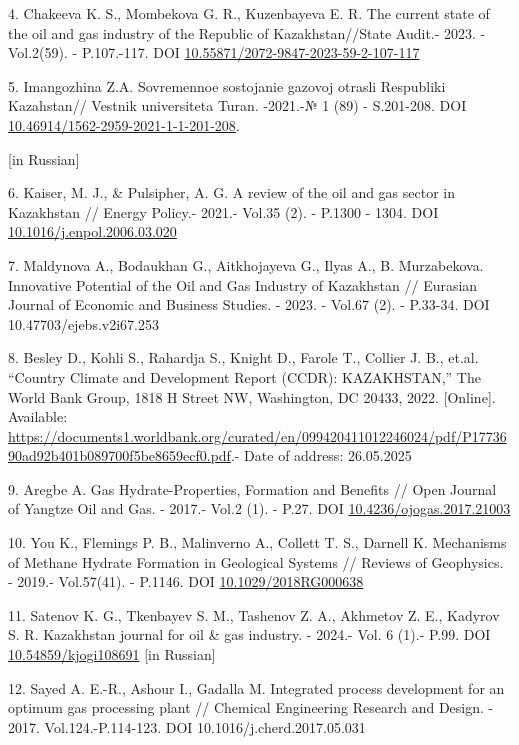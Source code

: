4. Chakeeva K. S., Mombekova G. R., Kuzenbayeva E. R. The current state
of the oil and gas industry of the Republic of Kazakhstan//State Audit.-
2023. -Vol.2(59). - P.107.-117. DOI
\href{https://doi.org/10.55871/2072-9847-2023-59-2-107-117}{10.55871/2072-9847-2023-59-2-107-117}

5. Imangozhina Z.A. Sovremennoe sostojanie gazovoj otrasli Respubliki
Kazahstan// Vestnik universiteta Turan. -2021.-№ 1 (89) - S.201-208.
DOI
\href{https://doi.org/10.46914/1562-2959-2021-1-1-201-208}{10.46914/1562-2959-2021-1-1-201-208}.

{[}in Russian{]}

6. Kaiser, M. J., \& Pulsipher, A. G. A review of the oil and gas sector
in Kazakhstan // Energy Policy.- 2021.- Vol.35 (2). - P.1300 - 1304. DOI
\href{http://dx.doi.org/10.1016/j.enpol.2006.03.020}{10.1016/j.enpol.2006.03.020}

7. Maldynova A., Bodaukhan G., Aitkhojayeva G., Ilyas A., B.
Murzabekova. Innovative Potential of the Oil and Gas Industry of
Kazakhstan // Eurasian Journal of Economic and Business Studies. - 2023.
- Vol.67 (2). - P.33-34. DOI 10.47703/ejebs.v2i67.253

8. Besley D., Kohli S., Rahardja S., Knight D., Farole T., Collier J.
B., et.al. ``Country Climate and Development Report (CCDR):
KAZAKHSTAN,'' The World Bank Group, 1818 H Street NW, Washington, DC
20433, 2022. {[}Online{]}. Available:
\url{https://documents1.worldbank.org/curated/en/099420411012246024/pdf/P1773690ad92b401b089700f5be8659ecf0.pdf}.-
Date of address: 26.05.2025

9. Aregbe A. Gas Hydrate-Properties, Formation and Benefits // Open
Journal of Yangtze Oil and Gas. - 2017.- Vol.2 (1). - P.27. DOI
\href{https://doi.org/10.4236/ojogas.2017.21003}{10.4236/ojogas.2017.21003}

10. You K., Flemings P. B., Malinverno A., Collett T. S., Darnell K.
Mechanisms of Methane Hydrate Formation in Geological Systems // Reviews
of Geophysics. - 2019.- Vol.57(41). - P.1146. DOI
\href{https://doi.org/10.1029/2018RG000638}{10.1029/2018RG000638}

11. Satenov K. G., Tkenbayev S. M., Tashenov Z. A., Akhmetov Z. E.,
Kadyrov S. R. Kazakhstan journal for oil \& gas industry. - 2024.- Vol.
6 (1).- P.99. DOI
\href{https://doi.org/10.54859/kjogi108691}{10.54859/kjogi108691} {[}in
Russian{]}

12. Sayed A. E.-R., Ashour I., Gadalla M. Integrated process development
for an optimum gas processing plant // Chemical Engineering Research and
Design. - 2017. Vol.124.-P.114-123. DOI 10.1016/j.cherd.2017.05.031

